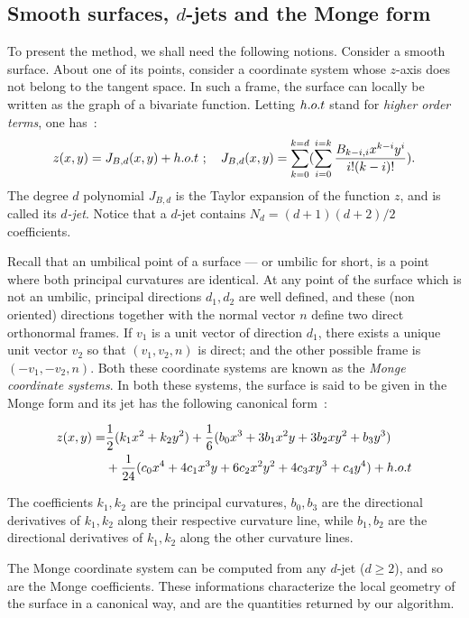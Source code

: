 \subsection{Smooth surfaces, $d$-jets and the Monge form}

To present the method, we shall need the following notions. Consider a
smooth surface.  About one of its points, consider a coordinate system
whose $z$-axis does not belong to the tangent space. In such a frame,
the surface can locally be written as the graph of a bivariate
function. Letting $h.o.t$ stand for {\em higher order terms}, one
has~:
%
\begin{equation}
z(x,y)=J_{B,d}(x,y) + h.o.t \ ; \quad 
J_{B,d}(x,y)=\sum_{k=0}^{k=d}(\sum_{i=0}^{i=k}
\frac{B_{k-i,i}x^{k-i}y^{i}}{i!(k-i)!}).
\end{equation}
The degree $d$ polynomial $J_{B,d}$ is the Taylor expansion of the
function $z$, and is called its {\em $d$-jet}. Notice that a $d$-jet contains
$N_d=(d+1)(d+2)/2$ coefficients.

Recall that an umbilical point of a surface --- or umbilic for short,
is a point where both principal curvatures are identical.  At any
point of the surface which is not an umbilic, principal directions
$d_1, d_2$ are well defined, and these (non oriented) directions
together with the normal vector $n$ define two direct orthonormal
frames. If $v_1$ is a unit vector of direction $d_1$, there exists a
unique unit vector $v_2$ so that $(v_1,v_2,n)$ is direct; and the
other possible frame is $(-v_1,-v_2,n)$.  Both these coordinate
systems are known as the {\em Monge coordinate systems}. In both these
systems, the surface is said to be given in the Monge form and its jet
has the following canonical form~:

\begin{eqnarray}
\label{eq:monge}
z(x,y) =  & \frac{1}{2}(k_1x^2 + k_2y^2)+
	\frac{1}{6}(b_0x^3+3b_1x^2y+3b_2xy^2+b_3y^3) \\
  &  +\frac{1}{24}(c_0x^4+4c_1x^3y+6c_2x^2y^2+4c_3xy^3+c_4y^4) + h.o.t
\end{eqnarray}

The coefficients $k_1, k_2$ are the principal curvatures,
$b_0,b_3$ are the directional derivatives of $k_1,k_2$ along their
respective curvature line, while $b_1,b_2$ are the directional
derivatives of $k_1,k_2$ along the other curvature lines.

The Monge coordinate system can be computed from any $d$-jet ($d\geq
2$), and so are the Monge coefficients. These informations
characterize the local geometry of the surface in a canonical way, and
are the quantities returned by our algorithm.



